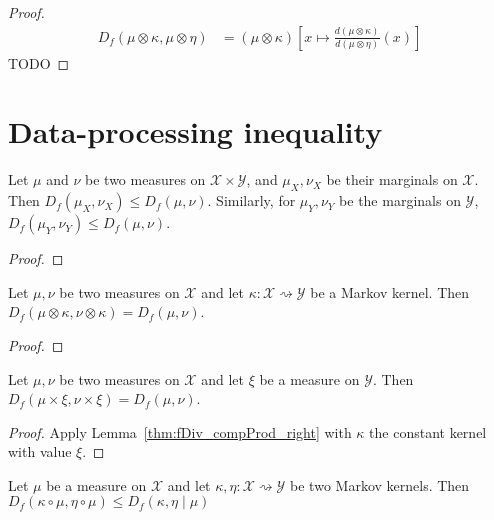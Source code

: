 \begin{proof}
\begin{align*}
D_f(\mu \otimes \kappa, \mu \otimes \eta)
&= (\mu \otimes \kappa)\left[ x \mapsto \frac{d (\mu \otimes \kappa)}{d (\mu \otimes \eta)}(x) \right]
\end{align*}
TODO
\end{proof}

\section{Data-processing inequality}

\begin{theorem}[Marginals]
  \label{thm:fDiv_fst_le}
  Let $\mu$ and $\nu$ be two measures on $\mathcal X \times \mathcal Y$, and $\mu_X, \nu_X$ be their marginals on $\mathcal X$.
  Then $D_f(\mu_X, \nu_X) \le D_f(\mu, \nu)$.
  Similarly, for $\mu_Y, \nu_Y$ be the marginals on $\mathcal Y$, $D_f(\mu_Y, \nu_Y) \le D_f(\mu, \nu)$.
\end{theorem}

\begin{proof}
\end{proof}

\begin{lemma}
  \label{thm:fDiv_compProd_right}
  Let $\mu, \nu$ be two measures on $\mathcal X$ and let $\kappa : \mathcal X \rightsquigarrow \mathcal Y$ be a Markov kernel.
  Then $D_f(\mu \otimes \kappa, \nu \otimes \kappa) = D_f(\mu, \nu)$.
\end{lemma}

\begin{proof}
\end{proof}

\begin{corollary}
  \label{cor:fDiv_prod_right}
  Let $\mu, \nu$ be two measures on $\mathcal X$ and let $\xi$ be a measure on $\mathcal Y$.
  Then $D_f(\mu \times \xi, \nu \times \xi) = D_f(\mu, \nu)$.
\end{corollary}

\begin{proof}
Apply Lemma~\ref{thm:fDiv_compProd_right} with $\kappa$ the constant kernel with value $\xi$.
\end{proof}

\begin{theorem}
  \label{thm:fDiv_comp_le_condFDiv}
  Let $\mu$ be a measure on $\mathcal X$ and let $\kappa, \eta : \mathcal X \rightsquigarrow \mathcal Y$ be two Markov kernels.
  Then $D_f(\kappa \circ \mu, \eta \circ \mu) \le D_f(\kappa, \eta \mid \mu)$
\end{theorem}

